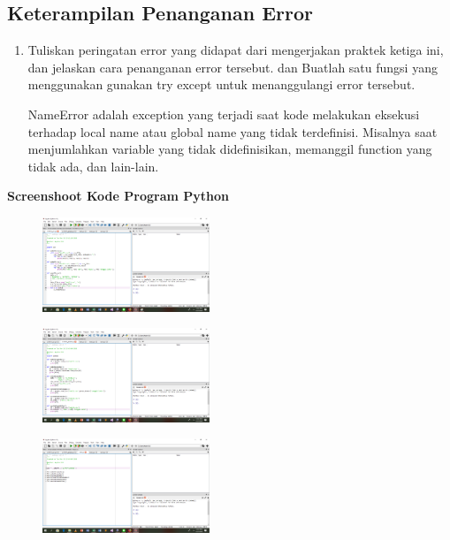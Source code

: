 \subsection{Keterampilan Penanganan Error}

\begin{enumerate}
	\item Tuliskan peringatan error yang didapat dari mengerjakan praktek ketiga ini,
dan jelaskan cara penanganan error tersebut. dan Buatlah satu fungsi yang
menggunakan gunakan try except untuk menanggulangi error tersebut.

	
	
	\par NameError adalah exception yang terjadi saat kode melakukan eksekusi terhadap local name atau global name yang tidak terdefinisi. Misalnya saat menjumlahkan variable yang tidak didefinisikan, memanggil function yang tidak ada, dan lain-lain.
	
\end{enumerate}

\textbf{Screenshoot Kode Program Python}

\begin{figure}[H]
 \includegraphics[width=5cm]{figures/4/1174074/Praktek/csv.png}
 \centering
\end{figure}

\begin{figure}[H]
 \includegraphics[width=5cm]{figures/4/1174074/Praktek/pandas.png}
 \centering
\end{figure}

\begin{figure}[H]
 \includegraphics[width=5cm]{figures/4/1174074/Praktek/main.png}
 \centering
\end{figure}

